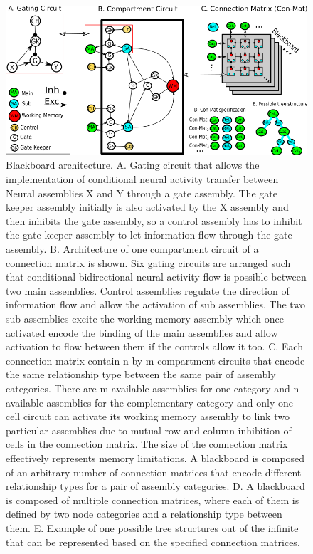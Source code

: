 \documentclass[10pt]{article}
\begin{document}
\begin{figure}[h!]
\begin{center}
\includegraphics[width=1.00\columnwidth]{figures/gating_circuit3/gating_circuit3}
\caption{{\label{Blackboard} Blackboard architecture.
A. Gating circuit that allows the implementation of conditional neural
activity transfer between Neural assemblies X and Y through a gate
assembly. The gate keeper assembly initially is also activated by the X
assembly and then inhibits the gate assembly, so a control assembly has
to inhibit the gate keeper assembly to let information flow through the
gate assembly. B. Architecture of one compartment circuit of a
connection matrix is shown. Six gating circuits are arranged such that
conditional bidirectional neural activity flow is possible between two
main assemblies. Control assemblies regulate the direction of
information flow and allow the activation of sub assemblies. The two sub
assemblies excite the working memory assembly which once activated
encode the binding of the main assemblies and allow activation to flow
between them if the controls allow it too. C. Each connection matrix
contain n by m compartment circuits that encode the same relationship
type between the same pair of assembly categories. There are m available
assemblies for one category and n available assemblies for the
complementary category and only one cell circuit can activate its
working memory assembly to link two particular assemblies due to mutual
row and column inhibition of cells in the connection matrix. The size of
the connection matrix effectively represents memory limitations. A
blackboard is composed of an arbitrary number of connection matrices
that encode different relationship types for a pair of assembly
categories. D. A blackboard is composed of multiple connection matrices,
where each of them is defined by two node categories and a relationship
type between them. E. Example of one possible tree structures out of the
infinite that can be represented based on the specified connection
matrices.%
}}
\end{center}
\end{figure}
\end{document}

